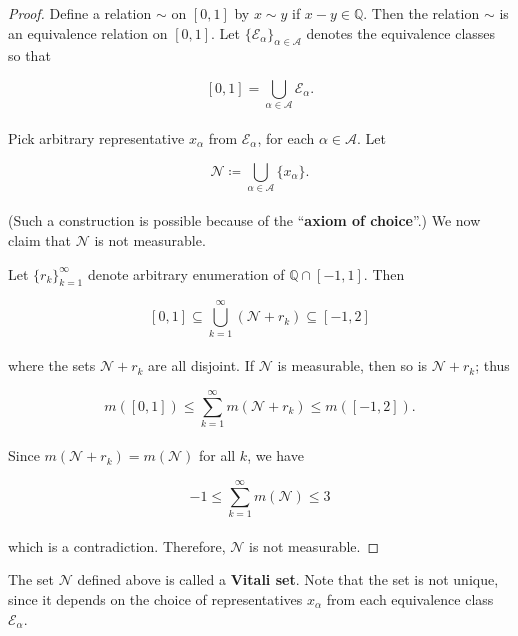 \documentclass[12pt, a4paper, openany, twoside]{book}
\theoremstyle{definition}
\theoremstyle{remark}
\newcommand{\BQ}{{\mathbb {Q}}} \newcommand{\BR}{{\mathbb {R}}}
\theoremstyle{plain}
\numberwithin{equation}{section}
\begin{document}
\begin{proof}
    Define a relation $\sim$ on $[0,1]$ by $x\sim y$ if $x-y\in\BQ$. Then the relation $\sim$ is an equivalence relation on $[0,1]$. Let $\{\mathcal{E}_\alpha\}_{\alpha\in\mathcal{A}}$ denotes the equivalence classes so that

    \[[0,1]=\bigcup_{\alpha\in\mathcal{A}}{\mathcal{E}_\alpha}.\]
    \\
    Pick arbitrary representative $x_\alpha$ from $\mathcal{E}_\alpha$, for each $\alpha\in\mathcal{A}$. Let 

    \[\mathcal{N}\coloneqq\bigcup_{\alpha\in\mathcal{A}}{\{x_\alpha\}}.\]
    \\
    (Such a construction is possible because of the ``\textbf{axiom of choice}''.) We now claim that $\mathcal{N}$ is not measurable.

    Let $\{r_k\}_{k=1}^{\infty}$ denote arbitrary enumeration of $\BQ\cap [-1,1]$. Then 
    
    \[[0,1]\subseteq \bigcup_{k=1}^{\infty}{(\mathcal{N}+r_k)}\subseteq [-1,2]\]
    \\
    where the sets $\mathcal{N}+r_k$ are all disjoint. If $\mathcal{N}$ is measurable, then so is $\mathcal{N}+r_k$; thus

    \[m([0,1])\leq \sum_{k=1}^{\infty}{m(\mathcal{N}+r_k)}\leq m([-1,2]).\]
    \\
    Since $m(\mathcal{N}+r_k)=m(\mathcal{N})$ for all $k$, we have 

    \[-1\leq \sum_{k=1}^{\infty}{m(\mathcal{N})}\leq 3\]
    \\
    which is a contradiction. Therefore, $\mathcal{N}$ is not measurable.
\end{proof}
\vspace{5mm}

The set $\mathcal{N}$ defined above is called a \textbf{Vitali set}. Note that the set is not unique, since it depends on the choice of representatives $x_\alpha$ from each equivalence class $\mathcal{E}_\alpha$.




\newpage
\end{document}
